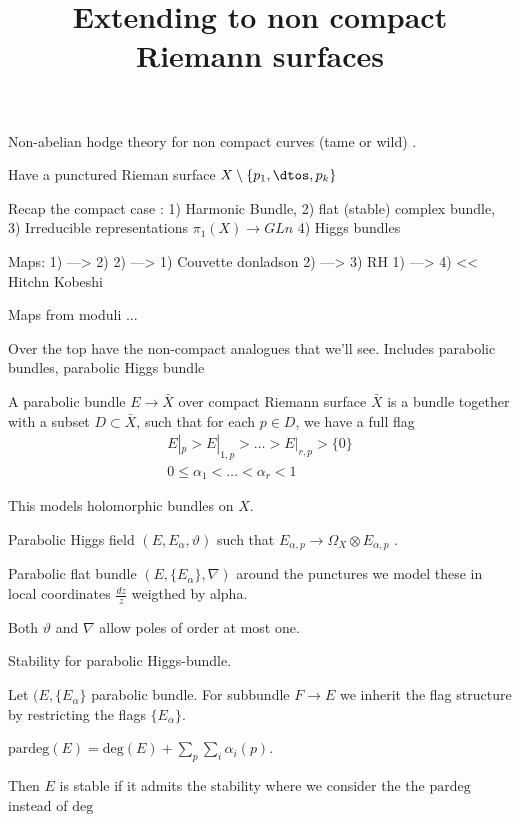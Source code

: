 % 


\title{Extending to non compact Riemann surfaces}
\author{}
\date{}

 
\maketitle
Non-abelian hodge theory for non compact curves (tame or wild) .

Have a punctured Rieman surface $ X \setminus \{ p_1 , \dtos, p_k \} $ 

Recap the compact case : 
1) Harmonic Bundle, 
2) flat (stable) complex bundle, 
3) Irreducible representations $ \pi_1(X) \rightarrow GLn $ 
4) Higgs bundles 

Maps: 
1) ---> 2)
2) ---> 1) Couvette donladson 
2) ---> 3) RH 
1) ---> 4) << Hitchn Kobeshi 


Maps from moduli ...

Over the top have the non-compact analogues that we'll see. 
Includes parabolic bundles, 
parabolic Higgs bundle 

\begin{definition}
    A parabolic bundle $ E \rightarrow \bar{X} $ over compact Riemann surface $ \bar{X}$ 
    is a bundle together with a subset $ D \subset \bar{X}$, 
    such that for each $p \in D$, we have a full flag 
    \begin{align}
        E|_p > E|_{1,p} > \dots > E|_{r , p } > \{ 0 \} \\
        0 \leq \alpha_ 1 < \dots < \alpha _r < 1
    \end{align}
\end{definition}

This models holomorphic bundles on $X$. 

Parabolic Higgs field $(E, E_\alpha , \vartheta) $ 
such that $ E_{\alpha , p } \rightarrow \Omega_X \otimes E_{\alpha, p} $ .

Parabolic flat bundle $(E, \{ E_\alpha \}, \nabla ) $ 
around the punctures we model these in local coordinates $ \frac{dz}{z} $ weigthed by alpha. 

Both $ \vartheta $ and $\nabla $ allow poles of order at most one. 

Stability for parabolic Higgs-bundle. 

\begin{definition}
    Let $ ( E, \{ E_\alpha \} $ parabolic bundle. 
    For subbundle $F \rightarrow  E $ we inherit the flag structure by restricting the flags $\{E_\alpha\} $.

    $\mathrm{pardeg}(E) = \mathrm{deg}(E) + \sum_p \sum_i \alpha_i(p) $. 
    
    Then $E$ is stable if it admits the stability where we consider the the $\mathrm{pardeg} $ instead of $\mathrm{deg}$ 
\end{definition}

